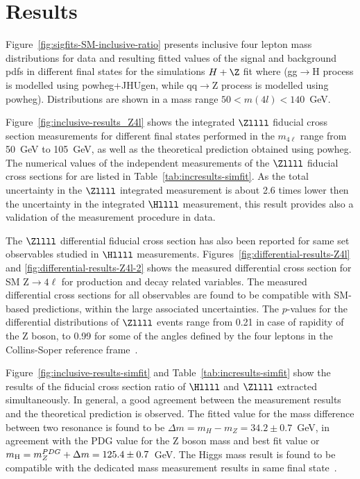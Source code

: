 \section{Results}
\par 
Figure~\ref{fig:sigfits-SM-inclusive-ratio} presents inclusive four lepton mass distributions for data 
and resulting fitted values of the signal and background pdfs in different final states for the simulations $H+\Z$ fit where 
(gg$\rightarrow$H process is modelled using {\sc powheg+JHUgen}, while qq$\rightarrow$Z process is modelled using {\sc powheg}). 
Distributions are shown in a mass  range $50 < m(4l) < 140$~GeV.
\par
Figure~\ref{fig:inclusive-results_Z4l} shows the integrated $\Zllll$ fiducial cross section measurements for different final states performed
in the $m_{4\ell}$ range from 50~GeV to 105~GeV, as well as the theoretical prediction obtained using {\sc powheg}. The numerical values of
the independent measurements of the $\Zllll$ fiducial cross sections for are listed in Table~\ref{tab:incresults-simfit}. As the total
uncertainty in the $\Zllll$ integrated measurement is about 2.6 times lower then the uncertainty in the integrated $\Hllll$ measurement, 
this result provides also a validation of the measurement procedure in data.  
\par
The $\Zllll$ differential fiducial cross section has also been reported for same set observables studied in $\Hllll$ measurements.
Figures~\ref{fig:differential-results-Z4l} and \ref{fig:differential-results-Z4l-2} shows the measured differential cross section for SM Z$\rightarrow 4\ell$ 
for production and decay related variables. The measured differential cross sections for all observables are  found to be compatible with  
SM-based predictions, within the large associated uncertainties.  The $p$-values for the differential distributions of $\Zllll$ events range from 0.21
in case of rapidity of the Z boson, to 0.99 for some of the angles defined by the four leptons in the Collins-Soper reference frame~\cite{Collins:1977iv}.
\par 
Figure~\ref{fig:inclusive-results-simfit}  and Table~\ref{tab:incresults-simfit} show the results of the  fiducial cross section ratio of  
$\Hllll$ and $\Zllll$ extracted simultaneously. In general, a  good agreement between the measurement results and the theoretical prediction is observed. 
The fitted value for the mass difference between two resonance is found to be $\Delta m = m_H - m_Z = 34.2 \pm 0.7$~GeV, in agreement with the PDG value 
for the Z boson mass and best fit value or $m_{\rm H} = m_{Z}^{PDG} + \Delta m = 125.4 \pm 0.7$~GeV. The Higgs mass result is  found to be compatible
with the dedicated mass measurement results in same final state~\cite{Reference25}. 

